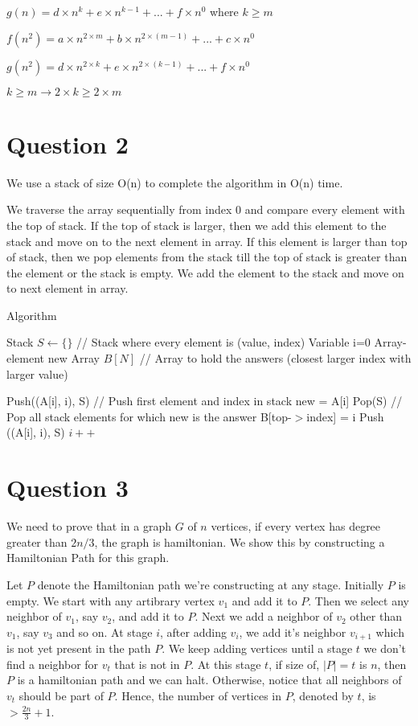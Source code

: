 \documentclass[a4paper]{article}
\begin{document}
$g(n) = d \times n^{k} + e \times n^{k-1} + ... + f \times n^{0}$ where $k \geq m$

$f(n^{2}) = a \times n^{2 \times m} + b \times n^{2 \times (m - 1)} + ... + c \times n^{0}$

$g(n^{2}) = d \times n^{2 \times k} + e \times n^{2 \times (k - 1)} + ... + f \times n^{0}$

$k \geq m \rightarrow 2 \times k \geq 2 \times m$
\section*{Question 2}
We use a stack of size O(n) to complete the algorithm in O(n) time. 

We traverse the array sequentially from index 0 and compare every element with the top of stack. If the top of stack is larger, then we add this element to the stack and move on to the next element in array. If this element is larger than top of stack, then we pop elements from the stack till the top of stack is greater than the element or the stack is empty. We add the element to the stack and move on to next element in array. 

Algorithm

\begin{algorithmic}
 \STATE Stack $S \leftarrow \{ \}$ // Stack where every element is (value, index)
 \STATE Variable i=0
	\STATE Array-element new
    \STATE Array $B[N]$ // Array to hold the answers (closest larger index with larger value)

 \STATE Push((A[i], i), S) // Push first element and index in stack
 \ENDIF
 \STATE new = A[i]
 \STATE Pop(S) // Pop all stack elements for which new is the answer
 \STATE B[top-$>$index] = i
 \ENDWHILE
 \STATE Push ((A[i], i), S)
 \STATE $i++$
 \ENDWHILE

\end{algorithmic}



\section*{Question 3}
We need to prove that in a graph $G$ of $n$ vertices, if every vertex has degree greater than $2n/3$, the graph is hamiltonian. We show this by constructing a Hamiltonian Path for this graph. 

Let $P$ denote the Hamiltonian path we're constructing at any stage. Initially $P$ is empty. We start with any artibrary vertex $v_1$ and add it to $P$. Then we select any neighbor of $v_1$, say $v_2$, and add it to $P$. Next we add a neighbor of $v_2$ other than $v_1$, say $v_3$ and so on. At stage $i$, after adding $v_i$, we add it's neighbor $v_{i+1}$ which is not yet present in the path $P$. We keep adding vertices until a stage $t$ we don't find a neighbor for $v_t$ that is not in $P$. At this stage $t$, if size of, $|P| = t$ is $n$, then $P$ is a hamiltonian path and we can halt. Otherwise, notice that all neighbors of $v_t$ should be part of $P$. Hence, the number of vertices in $P$, denoted by $t$, is $>\frac{2n}{3} + 1$.
\end{document}
